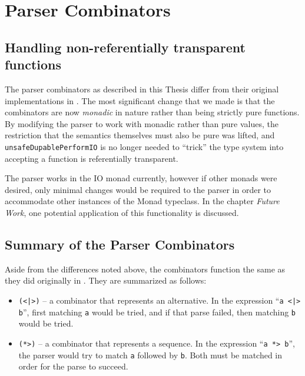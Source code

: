 \documentclass[../main.tex]{subfiles}
\begin{document}
\chapter{Parser Combinators}

\section{Handling non-referentially transparent functions}

The parser combinators as described in this Thesis differ from their original implementations
in \cite{frosthafiz2008}.  The most significant change that we made is that the combinators are now {\em monadic} in nature rather than being strictly pure functions.
By modifying the parser to work with monadic rather than pure values, the restriction that the semantics themselves must also be pure was lifted, and
\texttt{unsafeDupablePerformIO} is no longer needed to ``trick'' the type system into accepting a function is referentially transparent.

The parser works in the IO monad currently, however if other monads were desired, only minimal changes would be required to the parser in order to accommodate
other instances of the Monad typeclass.  In the chapter {\em Future Work}, one potential application of this functionality is discussed.


\section{Summary of the Parser Combinators}

Aside from the differences noted above, the combinators function the same as they did originally in \cite{frosthafiz2008}.  They are summarized as follows:

\begin{itemize}
	\item \texttt{(<|>)} -- a combinator that represents an alternative.  In the expression ``\texttt{a <|> b}'', first matching \texttt{a} would be tried, and if that parse failed, then matching \texttt{b} would be tried.
	\item \texttt{(*>)} -- a combinator that represents a sequence.  In the expression ``\texttt{a *> b}'', the parser would try to match \texttt{a} followed by \texttt{b}.  Both must be matched in order for the parse to succeed.
\end{itemize}
\end{document}
